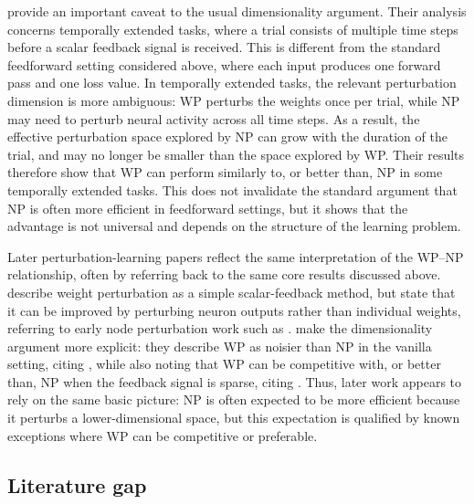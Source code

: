 \textcite{zuge_weight_2023} provide an important caveat to the usual dimensionality argument. Their analysis concerns temporally extended tasks, where a trial consists of multiple time steps before a scalar feedback signal is received. This is different from the standard feedforward setting considered above, where each input produces one forward pass and one loss value. In temporally extended tasks, the relevant perturbation dimension is more ambiguous: WP perturbs the weights once per trial, while NP may need to perturb neural activity across all time steps. As a result, the effective perturbation space explored by NP can grow with the duration of the trial, and may no longer be smaller than the space explored by WP. Their results therefore show that WP can perform similarly to, or better than, NP in some temporally extended tasks. This does not invalidate the standard argument that NP is often more efficient in feedforward settings, but it shows that the advantage is not universal and depends on the structure of the learning problem.

Later perturbation-learning papers reflect the same interpretation of the WP--NP relationship, often by referring back to the same core results discussed above. \textcite{lillicrap_backpropagation_2020} describe weight perturbation as a simple scalar-feedback method, but state that it can be improved by perturbing neuron outputs rather than individual weights, referring to early node perturbation work such as \textcite{flower_summed_1992}. \textcite{hiratani_stability_2022} make the dimensionality argument more explicit: they describe WP as noisier than NP in the vanilla setting, citing \textcite{werfel_learning_2003}, while also noting that WP can be competitive with, or better than, NP when the feedback signal is sparse, citing \textcite{zuge_weight_2023}. Thus, later work appears to rely on the same basic picture: NP is often expected to be more efficient because it perturbs a lower-dimensional space, but this expectation is qualified by known exceptions where WP can be competitive or preferable.
\subsection{Literature gap}

